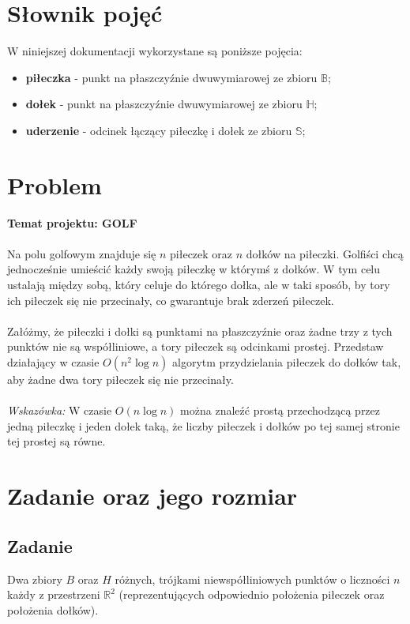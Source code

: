 \documentclass[10pt,a4paper]{article}
\begin{document}
	\newpage
	
	\section{Słownik pojęć}
	
	W niniejszej dokumentacji wykorzystane są poniższe pojęcia:
	\begin{itemize}
		\item \textbf{piłeczka} - punkt na płaszczyźnie dwuwymiarowej ze zbioru $\mathbb{B}$;
		\item \textbf{dołek} - punkt na płaszczyźnie dwuwymiarowej ze zbioru $\mathbb{H}$;
		\item \textbf{uderzenie} - odcinek łączący piłeczkę i dołek ze zbioru $\mathbb{S}$;
	\end{itemize}
	
	\section{Problem}
	
	\textbf{Temat projektu: GOLF} \\~\\
	Na polu golfowym znajduje się $n$ piłeczek oraz $n$ dołków na piłeczki. Golfiści chcą jednocześnie umieścić każdy swoją piłeczkę w którymś z dołków. W tym celu ustalają między sobą, który celuje do którego dołka, ale w taki sposób, by tory ich	piłeczek się nie przecinały, co gwarantuje brak zderzeń piłeczek.\\~\\ 
	Załóżmy, że piłeczki i dołki są punktami na płaszczyźnie oraz żadne trzy z tych punktów nie są współliniowe, a tory piłeczek są odcinkami prostej. Przedstaw działający w czasie $O(n^2\log n)$ algorytm przydzielania piłeczek do dołków tak, aby żadne dwa tory piłeczek się nie przecinały.\\~\\
	\textit{Wskazówka:} W czasie $O(n\log n)$ można znaleźć prostą przechodzącą przez jedną piłeczkę i jeden dołek taką, że liczby piłeczek i dołków po tej samej stronie tej prostej są równe.
	
	\section{Zadanie oraz jego rozmiar}
	
	\subsection{Zadanie}
	Dwa zbiory $B$ oraz $H$ różnych, trójkami niewspółliniowych punktów o liczności $n$ każdy z przestrzeni $\mathbb{R}^{2}$ (reprezentujących odpowiednio położenia piłeczek oraz położenia dołków).
	
\end{document}
